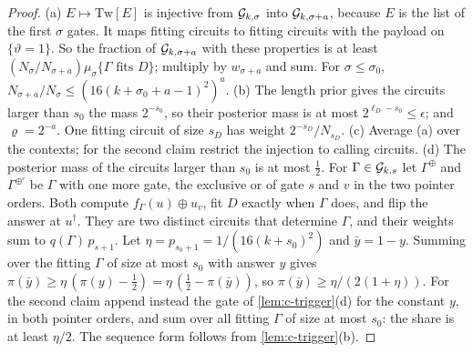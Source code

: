 \begin{proof}
(a) $E\mapsto\mathrm{Tw}[E]$ is injective from $\mathcal G_{k,\sigma}$ into $\mathcal G_{k,\sigma+a}$, because $E$ is the
list of the first $\sigma$ gates. It maps fitting circuits to fitting circuits with the payload on
$\{\vartheta=1\}$. So the fraction of $\mathcal G_{k,\sigma+a}$ with these properties is at least
$(N_\sigma/N_{\sigma+a})\mu_\sigma\{\Gamma\text{ fits }D\}$; multiply by $w_{\sigma+a}$ and sum. For
$\sigma\le\sigma_0$, $N_{\sigma+a}/N_\sigma\le(16(k+\sigma_0+a-1)^2)^a$. (b) The length prior gives the
circuits larger than $s_0$ the mass $2^{-s_0}$, so their posterior mass is at most
$2^{\ell_D-s_0}\le\epsilon$; and $\varrho=2^{-a}$. One fitting circuit of size $s_D$ has weight
$2^{-s_D}/N_{s_D}$. (c) Average (a) over the contexts; for the second claim restrict the injection to calling
circuits. (d) The posterior mass of the circuits larger than $s_0$ is at most $\frac12$. For
$\Gamma\in\mathcal G_{k,s}$ let $\Gamma^\oplus$ and $\Gamma^{\oplus\prime}$ be $\Gamma$ with one more gate, the
exclusive or of gate $s$ and $v$ in the two pointer orders. Both compute $f_\Gamma(u)\oplus u_v$, fit $D$
exactly when $\Gamma$ does, and flip the answer at $u^\dagger$. They are two distinct circuits that determine
$\Gamma$, and their weights sum to $q(\Gamma)\,p_{s+1}$. Let $\eta=p_{s_0+1}=1/(16(k+s_0)^2)$ and
$\bar y=1-y$. Summing over the fitting $\Gamma$ of size at most $s_0$ with answer $y$ gives
$\pi(\bar y)\ge\eta\,(\pi(y)-\frac12)=\eta\,(\frac12-\pi(\bar y))$, so $\pi(\bar y)\ge\eta/(2(1+\eta))$. For
the second claim append instead the gate of \cref{lem:c-trigger}(d) for the constant $y$, in both pointer
orders, and sum over all fitting $\Gamma$ of size at most $s_0$: the share is at least $\eta/2$. The sequence
form follows from \cref{lem:c-trigger}(b).
\end{proof}

